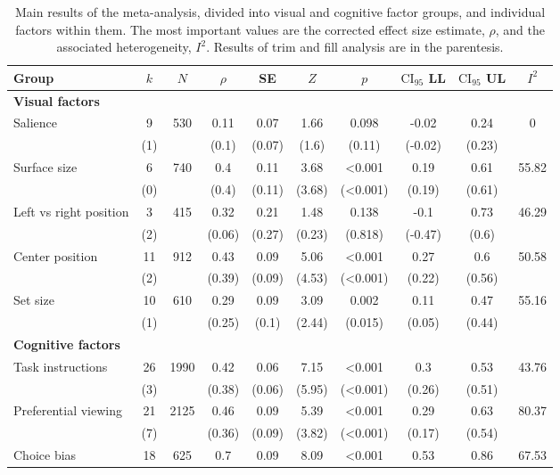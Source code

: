 \begin{table}[ht]
\centering
\caption{Main results of the meta-analysis, divided into visual and cognitive factor groups, and individual factors within them. The most important values are the corrected effect size estimate, $\rho$, and the associated heterogeneity, $I^2$. Results of trim and fill analysis are in the parentesis.} 
\label{tab:main_results}
\begingroup\small
\begin{tabular}{lccccccccc}
  \hline
Group & $k$ & $N$ & $\rho$ & SE & $Z$ & $p$ & $\textrm{CI}_{95}$ LL & $\textrm{CI}_{95}$ UL & $I^2$ \\ 
  \hline
\textbf{Visual factors} &  &  &  &  &  &  &  &  &  \\ 
  Salience & 9 & 530 & 0.11 & 0.07 & 1.66 & 0.098 & -0.02 & 0.24 & 0 \\ 
   & (1) &  & (0.1) & (0.07) & (1.6) & (0.11) & (-0.02) & (0.23) &  \\ 
  Surface size & 6 & 740 & 0.4 & 0.11 & 3.68 & <0.001 & 0.19 & 0.61 & 55.82 \\ 
   & (0) &  & (0.4) & (0.11) & (3.68) & (<0.001) & (0.19) & (0.61) &  \\ 
  Left vs right position & 3 & 415 & 0.32 & 0.21 & 1.48 & 0.138 & -0.1 & 0.73 & 46.29 \\ 
   & (2) &  & (0.06) & (0.27) & (0.23) & (0.818) & (-0.47) & (0.6) &  \\ 
  Center position & 11 & 912 & 0.43 & 0.09 & 5.06 & <0.001 & 0.27 & 0.6 & 50.58 \\ 
   & (2) &  & (0.39) & (0.09) & (4.53) & (<0.001) & (0.22) & (0.56) &  \\ 
  Set size & 10 & 610 & 0.29 & 0.09 & 3.09 & 0.002 & 0.11 & 0.47 & 55.16 \\ 
   & (1) &  & (0.25) & (0.1) & (2.44) & (0.015) & (0.05) & (0.44) &  \\ 
  \textbf{Cognitive factors} &  &  &  &  &  &  &  &  &  \\ 
  Task instructions & 26 & 1990 & 0.42 & 0.06 & 7.15 & <0.001 & 0.3 & 0.53 & 43.76 \\ 
   & (3) &  & (0.38) & (0.06) & (5.95) & (<0.001) & (0.26) & (0.51) &  \\ 
  Preferential viewing & 21 & 2125 & 0.46 & 0.09 & 5.39 & <0.001 & 0.29 & 0.63 & 80.37 \\ 
   & (7) &  & (0.36) & (0.09) & (3.82) & (<0.001) & (0.17) & (0.54) &  \\ 
  Choice bias & 18 & 625 & 0.7 & 0.09 & 8.09 & <0.001 & 0.53 & 0.86 & 67.53 \\ 

\end{tabular}
\end{table}
